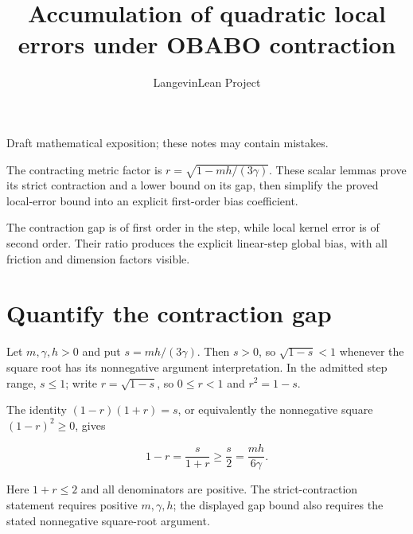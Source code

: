 \documentclass[11pt,a4paper]{article}
\title{\texorpdfstring{Accumulation of quadratic local errors under OBABO contraction}{Accumulation of quadratic local errors under OBABO contraction}}
\author{LangevinLean Project}
\date{}
\begin{document}
\maketitle
Draft mathematical exposition; these notes may contain mistakes.


The contracting metric factor is \(r=\sqrt{1-mh/(3\gamma)}\). These scalar lemmas prove its strict contraction and a lower bound on its gap, then simplify the proved local-error bound into an explicit first-order bias coefficient.



The contraction gap is of first order in the step, while local kernel error is of second order. Their ratio produces the explicit linear-step global bias, with all friction and dimension factors visible.


\section{\texorpdfstring{Quantify the contraction gap}{Quantify the contraction gap}}


Let \(m,\gamma,h>0\) and put \(s=mh/(3\gamma)\). Then \(s>0\), so \(\sqrt{1-s}<1\) whenever the square root has its nonnegative argument interpretation. In the admitted step range, \(s\le1\); write \(r=\sqrt{1-s}\), so \(0\le r<1\) and \(r^2=1-s\).



The identity \((1-r)(1+r)=s\), or equivalently the nonnegative square \((1-r)^2\ge0\), gives

\[1-r=\frac{s}{1+r}\ge\frac s2=\frac{mh}{6\gamma}.\]

Here \(1+r\le2\) and all denominators are positive. The strict-contraction statement requires positive \(m,\gamma,h\); the displayed gap bound also requires the stated nonnegative square-root argument.
\end{document}
